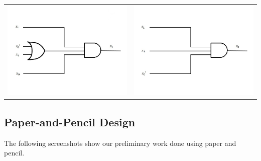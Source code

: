 \documentclass{article}
\begin{document}
\begin{table}[h!]
\begin{tabular}{ c c }
\centering
\includegraphics[scale=0.3]{z1} &
\includegraphics[scale=0.3]{z0} \\
\end{tabular}
\end{table}


\subsection{Paper-and-Pencil Design}
The following screenshots show our preliminary work done using paper and 
pencil.

\end{document}
